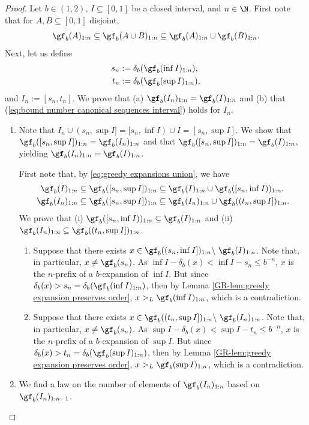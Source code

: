 \begin{proof}
    Let $b \in (1,2)$, $I \subseteq [0,1]$ be a closed interval, and $n \in \N$. First note that for $A,B \subseteq [0,1]$ disjoint,
    \begin{equation}\label{eq:greedy expansions union}
        \gf_b(A )_{1:n} \subseteq \gf_b(A \cup B)_{1:n} \subseteq \gf_b(A)_{1:n} \cup \gf_b(B)_{1:n}.
    \end{equation}
    Next, let us define 
    \begin{align}
        s_n &:= \delta_b(\gf_b(\inf I)_{1:n}),\\
        t_n &:= \delta_b(\gf_b(\sup I)_{1:n}),
    \end{align}
    and $I_n := [s_n,t_n]$. We prove that (a) $\gf_b(I_n)_{1:n} = \gf_b(I)_{1:n}$ and (b) that (\ref{eq:bound number canonical sequences interval}) holds for $I_n$.
    \begin{enumerate}[label=(\alph*)]
        \item Note that $I_n \cup (s_n, \sup I] = [s_n, \inf I) \cup I = [s_n, \sup I]$. We show that $\gf_b([s_n, \sup I])_{1:n} =\gf_b(I_n)_{1:n}$ and that $\gf_b([s_n, \sup I])_{1:n} =\gf_b(I)_{1:n}$, yielding $\gf_b(I_n)_{1:n} =\gf_b(I)_{1:n}$. 
        
        First note that, by \ref{eq:greedy expansions union}, we have
        \begin{align}
            \gf_b(I)_{1:n} &\subseteq \gf_b([s_n, \sup I])_{1:n} \subseteq \gf_b(I)_{1:n} \cup \gf_b([s_n,\inf I))_{1:n}.\\
            \gf_b(I_n)_{1:n} &\subseteq \gf_b([s_n, \sup I])_{1:n} \subseteq \gf_b(I_n)_{1:n} \cup \gf_b((t_n,\sup I])_{1:n}.
        \end{align}
        We prove that (i) $\gf_b([s_n,\inf I))_{1:n} \subseteq \gf_b(I)_{1:n}$ and (ii) $\gf_b(I_n)_{1:n} \subseteq \gf_b((t_n,\sup I])_{1:n}$.

        \begin{enumerate}[label=(\roman*)]
            \item Suppose that there exists $x \in \gf_b((s_n, \inf I])_{1:n} \backslash \ \gf_b(I)_{1:n}$. Note that, in particular, $x \neq \gf_b(s_n)$. As $\inf I - \delta_b(x) < \inf I - s_n \leq b^{-n}$, $x$ is the $n$-prefix of a $b$-expansion of $\inf I$. But since $\delta_b(x) > s_n = \delta_b(\gf_b(\inf I)_{1:n})$, then by Lemma \ref{GR-lem:greedy expansion preserves order}, $x >_L \gf_b(\inf I)_{1:n}$, which is a contradiction.
            \item Suppose that there exists $x \in \gf_b((t_n, \sup I])_{1:n} \backslash \ \gf_b(I_n)_{1:n}$. Note that, in particular, $x \neq \gf_b(s_n)$. As $\sup I - \delta_b(x) < \sup I - t_n \leq b^{-n}$, $x$ is the $n$-prefix of a $b$-expansion of $\sup I$. But since $\delta_b(x) > t_n = \delta_b(\gf_b(\sup I)_{1:n})$, then by Lemma \ref{GR-lem:greedy expansion preserves order}, $x >_L \gf_b(\sup I)_{1:n}$, which is a contradiction.
        \end{enumerate}
        \item We find a law on the number of elements of $\gf_b(I_n)_{1:n}$ based on $\gf_b(I_n)_{1:n-1}$.
    \end{enumerate}
\end{proof}

